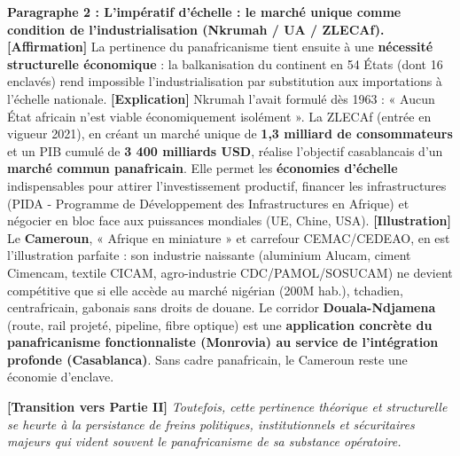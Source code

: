 \documentclass[11pt]{article}
\newcommand{\cle}[1]{{\popxbold\color{popdark}#1}}
\begin{document}
\begin{exoresolu}
\textbf{Paragraphe 2 : L'impératif d'échelle : le marché unique comme condition de l'industrialisation (Nkrumah / UA / ZLECAf).}
\textbf{[Affirmation]} La pertinence du panafricanisme tient ensuite à une \textbf{nécessité structurelle économique} : la balkanisation du continent en 54 États (dont 16 enclavés) rend impossible l'industrialisation par substitution aux importations à l'échelle nationale. \textbf{[Explication]} \cle{Nkrumah} l'avait formulé dès 1963 : « Aucun État africain n'est viable économiquement isolément ». La \cle{ZLECAf} (entrée en vigueur 2021), en créant un marché unique de \textbf{1,3 milliard de consommateurs} et un PIB cumulé de \textbf{3 400 milliards USD}, réalise l'objectif casablancais d'un \textbf{marché commun panafricain}. Elle permet les \textbf{économies d'échelle} indispensables pour attirer l'investissement productif, financer les infrastructures (PIDA - Programme de Développement des Infrastructures en Afrique) et négocier en bloc face aux puissances mondiales (UE, Chine, USA). \textbf{[Illustration]} Le \textbf{Cameroun}, « Afrique en miniature » et carrefour CEMAC/CEDEAO, en est l'illustration parfaite : son industrie naissante (aluminium Alucam, ciment Cimencam, textile CICAM, agro-industrie CDC/PAMOL/SOSUCAM) ne devient compétitive que si elle accède au marché nigérian (200M hab.), tchadien, centrafricain, gabonais sans droits de douane. Le corridor \textbf{Douala-Ndjamena} (route, rail projeté, pipeline, fibre optique) est une \textbf{application concrète du panafricanisme fonctionnaliste (Monrovia) au service de l'intégration profonde (Casablanca)}. Sans cadre panafricain, le Cameroun reste une économie d'enclave.

\textbf{[Transition vers Partie II]} \emph{Toutefois, cette pertinence théorique et structurelle se heurte à la persistance de freins politiques, institutionnels et sécuritaires majeurs qui vident souvent le panafricanisme de sa substance opératoire.}
\end{exoresolu}
\end{document}
